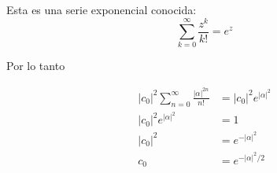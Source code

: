 \documentclass{report}
\begin{document}
Esta es una serie exponencial conocida:
\[
  \sum_{k = 0}^\infty \frac{z^k}{k!} = e^z
\]

Por lo tanto

\begin{align*}
  \left|c_0\right|^2 \sum_{n = 0}^{\infty} \frac{\left|\alpha\right|^{2n}}{n!} &= \left|c_0\right|^2 e^{\left|\alpha\right|^2}\\
  \left|c_0\right|^2 e^{\left|\alpha\right|^2} &= 1\\
  \left|c_0\right|^2 &= e^{-\left|\alpha\right|^2}\\
  c_0 &= e^{-\left|\alpha\right|^2/2}
\end{align*}

\pagebreak

\section{}
\end{document}
